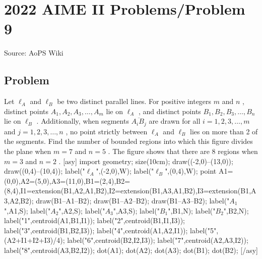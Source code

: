 \documentclass[12pt]{article}
\begin{document}
\section*{{2022 AIME II Problems/Problem 9}}
Source: AoPS Wiki

\subsection*{Problem}
Let $\ell_A$ and $\ell_B$ be two distinct parallel lines. For positive integers $m$ and $n$ , distinct points $A_1, A_2, \allowbreak A_3, \allowbreak \ldots, \allowbreak A_m$ lie on $\ell_A$ , and distinct points $B_1, B_2, B_3, \ldots, B_n$ lie on $\ell_B$ . Additionally, when segments $\overline{A_iB_j}$ are drawn for all $i=1,2,3,\ldots, m$ and $j=1,\allowbreak 2,\allowbreak 3, \ldots, \allowbreak n$ , no point strictly between $\ell_A$ and $\ell_B$ lies on more than 2 of the segments. Find the number of bounded regions into which this figure divides the plane when $m=7$ and $n=5$ . The figure shows that there are 8 regions when $m=3$ and $n=2$ . [asy] import geometry; size(10cm); draw((-2,0)--(13,0)); draw((0,4)--(10,4)); label("$\ell_A$",(-2,0),W); label("$\ell_B$",(0,4),W); point A1=(0,0),A2=(5,0),A3=(11,0),B1=(2,4),B2=(8,4),I1=extension(B1,A2,A1,B2),I2=extension(B1,A3,A1,B2),I3=extension(B1,A3,A2,B2); draw(B1--A1--B2); draw(B1--A2--B2); draw(B1--A3--B2); label("$A_1$",A1,S); label("$A_2$",A2,S); label("$A_3$",A3,S); label("$B_1$",B1,N); label("$B_2$",B2,N); label("1",centroid(A1,B1,I1)); label("2",centroid(B1,I1,I3)); label("3",centroid(B1,B2,I3)); label("4",centroid(A1,A2,I1)); label("5",(A2+I1+I2+I3)/4); label("6",centroid(B2,I2,I3)); label("7",centroid(A2,A3,I2)); label("8",centroid(A3,B2,I2)); dot(A1); dot(A2); dot(A3); dot(B1); dot(B2); [/asy]
\end{document}
